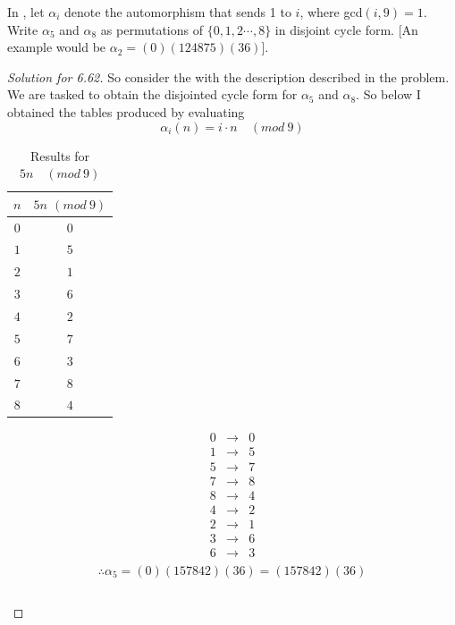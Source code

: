 \begin{assignment}[
  header=HeaderA,
  body=BodyA,
  title={Homework 4},
  duedate={\today},
  toc=false,
  toctitle={This appears on the Table of contents.},
  exlist=false
]
\begin{exer}[Problem 6.62]
In , let $\alpha_i$ denote the automorphism that sends 1 to $i$, where gcd$(i,9) = 1$. Write $\alpha_5$ and $\alpha_8$ as permutations of $\{0,1,2\cdots,8\}$ in disjoint cycle form. [An example would be $\alpha_2 = (0)(124875)(36)$].
\begin{proof}[Solution for 6.62]
So consider the  with the description described in the problem. We are tasked to obtain the disjointed cycle form for $\alpha_5$ and $\alpha_8$. So below I obtained the tables produced by evaluating
\[
\alpha_i(n) = i \cdot n \quad (mod\ 9)
\]

    \begin{table}[h]
        \centering
        \begin{tabular}{c|c}
            $n$ & $5n$ $(mod\ 9)$   \\
             \hline
             $0$ & $0$\\
             $1$ & $5$\\
             $2$ & $1$\\
             $3$ & $6$\\
             $4$ & $2$\\
             $5$ & $7$\\
             $6$ & $3$\\
             $7$ & $8$\\
             $8$ & $4$\\
        \end{tabular}
        \caption{Results for $5n \quad (mod\ 9)$}
    \end{table}
    \[
    \begin{array}{rcl}
         0 & \to & 0  \\
         \hline
         1 & \to & 5\\
         5 & \to & 7\\
         7 & \to & 8\\
         8 & \to & 4\\
         4 & \to & 2 \\
         2 & \to & 1 \\
         \hline
         3 & \to & 6\\
         6 & \to & 3\\
    \end{array}
    \]
    \[
    \therefore \alpha_5 = (0)(157842)(36) = (157842)(36) 
    \]
    \begin{table}[h]
        \centering
        \begin{tabular}{c|c}

\end{tabular}
\end{table}
\end{proof}
\end{exer}
\end{assignment}

